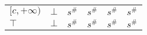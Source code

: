 \documentclass{article}
\begin{document}
\begin{table}
{\begin{tabular}{|l|l|ll|ll|ll|l|}
    \multirow{3}{*}{$[c, +\infty)$} & \multirow{3}{*}{$\bot$} & \multicolumn{2}{l|}{\multirow{3}{*}{$s^\#$}}                                       & \multicolumn{2}{l|}{\multirow{3}{*}{$s^\#$}}             & \multicolumn{2}{l|}{\multirow{3}{*}{$s^\#$}}                                       & \multirow{3}{*}{$s^\#$} \\
                                    &                         & \multicolumn{2}{l|}{}                                                              & \multicolumn{2}{l|}{}                                    & \multicolumn{2}{l|}{}                                                              &                         \\
                                    &                         & \multicolumn{2}{l|}{}                                                              & \multicolumn{2}{l|}{}                                    & \multicolumn{2}{l|}{}                                                              &                         \\ \hline
    $\top$                          & $\bot$                  & \multicolumn{2}{l|}{$s^\#$}                                                        & \multicolumn{2}{l|}{$s^\#$}                              & \multicolumn{2}{l|}{$s^\#$}                                                        & $s^\#$                  \\ \hline
    \end{tabular}
    }
    \end{table}


\end{document}
